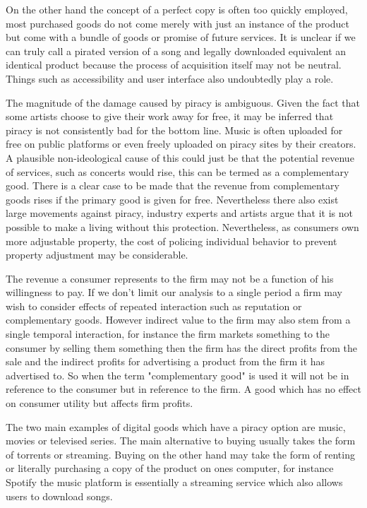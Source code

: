 \documentclass{article}
\begin{document}
On the other hand the concept of a perfect copy is often too quickly employed, most purchased goods do not come merely with just an instance of the product but come with a bundle of goods or promise of future services. It is unclear if we can truly call a pirated version of a song and legally downloaded equivalent an identical product because the process of acquisition itself may not be neutral. Things such as accessibility and user interface also undoubtedly play a role. 
\fi

The magnitude of the damage caused by piracy is ambiguous. Given the fact that some artists choose to give their work away for free, it may be inferred that piracy is not consistently bad for the bottom line. Music is often uploaded for free on public platforms or even freely uploaded on piracy sites by their creators. A plausible non-ideological cause of this could just be that the potential revenue of services, such as concerts would rise, this can be termed as a complementary good. There is a clear case to be made that the revenue from complementary goods rises if the primary good is given for free.  Nevertheless there also exist large movements against piracy, industry experts and artists argue that it is not possible to make a living without this protection. Nevertheless, as consumers own more adjustable property, the cost of policing individual behavior to prevent property adjustment may be considerable. 

The revenue a consumer represents to the firm may not be a function of his willingness to pay. If we don't limit our analysis to a single period a firm may wish to consider effects of repeated interaction such as reputation or complementary goods. However indirect value to the firm may also stem from a single temporal interaction, for instance the firm markets something to the consumer by selling them something then the firm has the direct profits from the sale and the indirect profits for advertising a product from the firm it has advertised to. So when the term "complementary good" is used it will not be in reference to the consumer but in reference to the firm. A good which has no effect on consumer utility but affects firm profits. 

The two main examples of digital goods which have a piracy option are music, movies or televised series. The main alternative to buying usually takes the form of torrents or streaming. Buying on the other hand may take the form of renting or literally purchasing a copy of the product on ones computer, for instance Spotify the music platform is essentially a streaming service which also allows users to download songs. 
\end{document}
